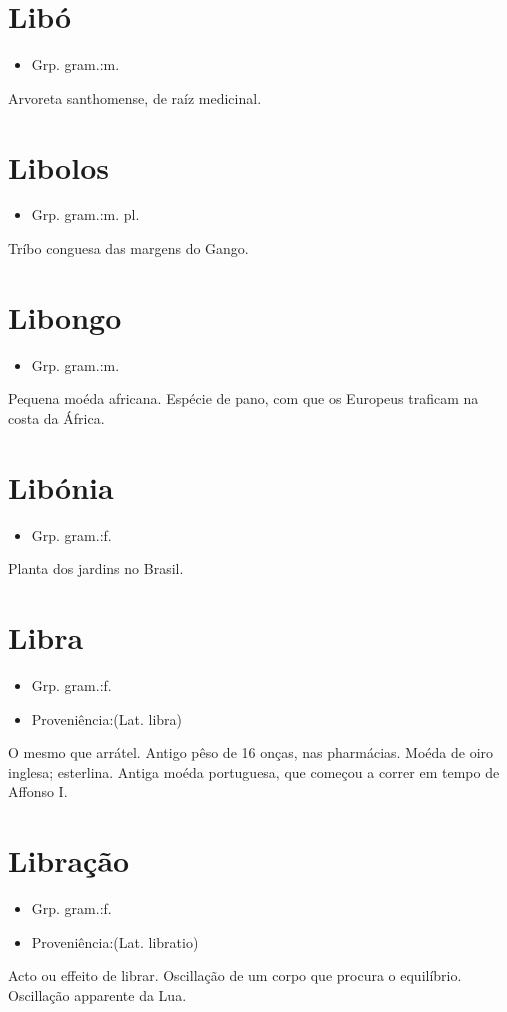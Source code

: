 \section{Libó}
\begin{itemize}
\item {Grp. gram.:m.}
\end{itemize}
Arvoreta santhomense, de raíz medicinal.
\section{Libolos}
\begin{itemize}
\item {Grp. gram.:m. pl.}
\end{itemize}
Tríbo conguesa das margens do Gango.
\section{Libongo}
\begin{itemize}
\item {Grp. gram.:m.}
\end{itemize}
Pequena moéda africana.
Espécie de pano, com que os Europeus traficam na costa da África.
\section{Libónia}
\begin{itemize}
\item {Grp. gram.:f.}
\end{itemize}
Planta dos jardins no Brasil.
\section{Libra}
\begin{itemize}
\item {Grp. gram.:f.}
\end{itemize}
\begin{itemize}
\item {Proveniência:(Lat. \textunderscore libra\textunderscore )}
\end{itemize}
O mesmo que \textunderscore arrátel\textunderscore .
Antigo pêso de 16 onças, nas pharmácias.
Moéda de oiro inglesa; esterlina.
Antiga moéda portuguesa, que começou a correr em tempo de Affonso I.
\section{Libração}
\begin{itemize}
\item {Grp. gram.:f.}
\end{itemize}
\begin{itemize}
\item {Proveniência:(Lat. \textunderscore libratio\textunderscore )}
\end{itemize}
Acto ou effeito de librar.
Oscillação de um corpo que procura o equilíbrio.
Oscillação apparente da Lua.
